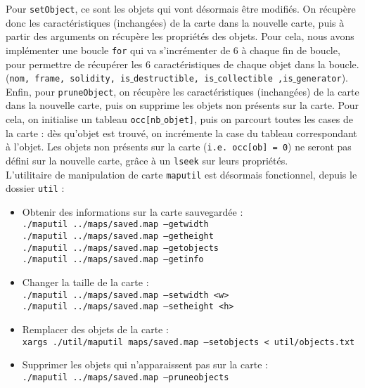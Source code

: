\documentclass[a4paper, 12pt]{article}
\begin{document}
	 Pour \texttt{setObject}, ce sont les objets qui vont désormais être modifiés. On récupère donc les caractéristiques (inchangées) de la carte dans la nouvelle carte, puis à partir des arguments on récupère les propriétés des objets. Pour cela, nous avons implémenter une boucle \texttt{for} qui va s'incrémenter de 6 à chaque fin de boucle, pour permettre de récupérer les 6 caractéristiques de chaque objet dans la boucle. (\texttt{nom, frame, solidity, is$\_$destructible, is$\_$collectible ,is$\_$generator}). \\
	
	 Enfin, pour \texttt{pruneObject}, on récupère les caractéristiques (inchangées) de la carte dans la nouvelle carte, puis on supprime les objets non présents sur la carte. Pour cela, on initialise un tableau \texttt{occ[nb$\_$objet]}, puis on parcourt toutes les cases de la carte : dès qu'objet est trouvé, on incrémente la case du tableau correspondant à l'objet. Les objets non présents sur la carte (\texttt{i.e. occ[ob] = 0}) ne seront pas défini sur la nouvelle carte, grâce à un \texttt{lseek} sur leurs propriétés.\\

L'utilitaire de manipulation de carte \texttt{maputil} est désormais fonctionnel, depuis le dossier \texttt{util} :
\begin{itemize}
	\item Obtenir des informations sur la carte sauvegardée : \\
		 \texttt{./maputil ../maps/saved.map --getwidth} \\
		 \texttt{./maputil ../maps/saved.map --getheight} \\
		 \texttt{./maputil ../maps/saved.map --getobjects} \\
		 \texttt{./maputil ../maps/saved.map --getinfo} \\
		
	\item Changer la taille de la carte : \\
		 \texttt{./maputil ../maps/saved.map --setwidth <w>} \\
		 \texttt{./maputil ../maps/saved.map --setheight <h>} \\
	
	\item Remplacer des objets de la carte : \\
		\texttt{xargs ./util/maputil maps/saved.map --setobjects < util/objects.txt} \\
	
	\item Supprimer les objets qui n'apparaissent pas sur la carte : \\
		\texttt{./maputil ../maps/saved.map --pruneobjects}
\end{itemize}
\end{document}
